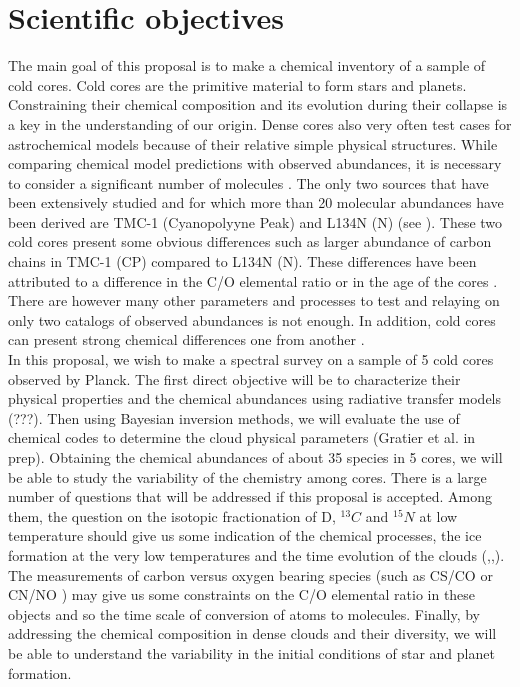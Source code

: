 \section{Scientific objectives}

The main goal of this proposal is to make a chemical inventory of a sample of cold cores. Cold cores are the primitive material to form stars and planets. Constraining their chemical composition and its evolution during their collapse is a key in the understanding of our origin. Dense cores also very often test cases for astrochemical models because of their relative simple physical structures. While comparing chemical model predictions with observed abundances, it is necessary to consider a significant number of molecules \cite{Wakelam_2006,2013ChRv..113.8710A}. The only two sources that have been extensively studied and for which more than 20 molecular abundances have been derived are TMC-1 (Cyanopolyyne Peak) and L134N (N) (see \cite{2013ChRv..113.8710A}). These two cold cores present some obvious differences such as larger abundance of carbon chains in TMC-1 (CP) compared to L134N (N). These differences have been attributed to a difference in the C/O elemental ratio \cite{1998ApJ...501..207T} or in the age of the cores \cite{2013ChRv..113.8710A}. There are however many other parameters and processes to test and relaying on only two catalogs of observed abundances is not enough. In addition, cold cores can present strong chemical differences one from another \cite{2006FaDi..133...63B}.\\
In this proposal, we wish to make a spectral survey on a sample of 5 cold cores observed by Planck. The first direct objective will be to characterize their physical properties and the chemical abundances using radiative transfer models (???). Then using Bayesian inversion methods, we will evaluate the use of chemical codes to determine the cloud physical parameters (Gratier et al. in prep). Obtaining the chemical abundances of about 35 species in 5 cores, we will be able to study the variability of the chemistry among cores. There is a large number of questions that will be addressed if this proposal is accepted. Among them, the question on the isotopic fractionation of D, $^{13}C$ and $^{15}N$ at low temperature should give us some indication of the chemical processes, the ice formation at the very low temperatures and the time evolution of the clouds (\cite{2013A&A...551A..38P},\cite{2014prpl.conf..859C},\cite{2015A&A...576A..99R}). The measurements of carbon versus oxygen bearing species (such as CS/CO \cite{1997ApJ...482..285B} or CN/NO \cite{2014A&A...562A..83L}) may give us some constraints on the C/O elemental ratio in these objects and so the time scale of conversion of atoms to molecules. Finally, by addressing the chemical composition in dense clouds and their diversity, we will be able to understand the variability in the initial conditions of star and planet formation. 

  